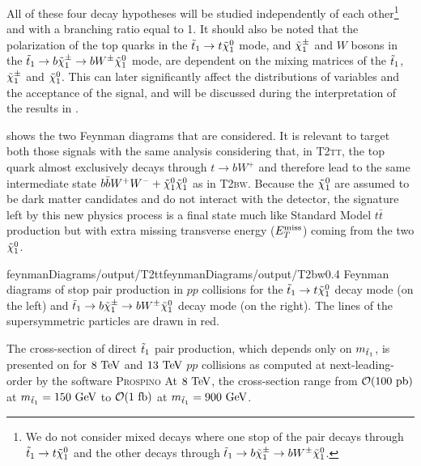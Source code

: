         All of these four decay hypotheses will be studied independently
        of each other\footnote{We do not consider mixed decays where one stop of the pair
        decays through $\tilde{t}_1 \rightarrow t \tilde{\chi}_1^0$ and the other decays through
        $\tilde{t}_1 \rightarrow b \tilde{\chi}_1^\pm \rightarrow b W^{\pm} \tilde{\chi}_1^0$.} and with a
        branching ratio equal to 1. It should also be noted that the polarization of the
        top quarks in the $\tilde{t}_1 \rightarrow t \tilde{\chi}_1^0$ mode, and $\tilde{\chi}_1^\pm$ and
        $W$ bosons in the $\tilde{t}_1 \rightarrow b \tilde{\chi}_1^\pm \rightarrow b W^{\pm}
        \tilde{\chi}_1^0$ mode, are dependent on the mixing matrices of the $\tilde{t}_1$, $\tilde{\chi}_1^\pm$
        and $\tilde{\chi}_1^0$. This can later significantly affect the distributions of
        variables and the acceptance of the signal, and will be discussed during the
        interpretation of the results in .

         shows the two Feynman diagrams that are
        considered. It is relevant to target both those signals with the same analysis
        considering that, in \textsc{T2tt}, the top quark almost exclusively decays
        through $t \rightarrow b W^+$ and therefore lead to the same intermediate state
        $b \bar{b} W^+ W^- + \tilde{\chi}_1^0 \tilde{\chi}_1^0$ as in \textsc{T2bw}. Because the
        $\tilde{\chi}_1^0$ are assumed to be dark matter candidates and do not interact with
        the detector, the signature left by this new physics process is a final state much
        like Standard Model $t\bar{t}$ production but with extra missing transverse energy
        ($E_T^\text{miss}$) coming from the two $\tilde{\chi}_1^0$.

                         {feynmanDiagrams/output/T2tt}{feynmanDiagrams/output/T2bw}{0.4}
                         {Feynman diagrams of stop pair production in $pp$ collisions for the
                         $\tilde{t}_1 \rightarrow t \tilde{\chi}_1^0$ decay mode (on the left) and
                         $\tilde{t}_1 \rightarrow b \tilde{\chi}_1^\pm \rightarrow b W^{\pm} \tilde{\chi}_1^0$ decay mode
                         (on the right). The lines of the supersymmetric particles are drawn in red.}

        The cross-section of direct $\tilde{t}_1$ pair production, which depends only on $m_{\tilde{t}_1}$, is presented
        on  for $8~\text{TeV}$ and $13~\text{TeV}$ $pp$ collisions as computed at next-leading-order
        by the software \textsc{Prospino} \cite{Prospino} At $8~\text{TeV}$, the cross-section range from $\mathcal{O}(100~\text{pb})$
        at $m_{\tilde{t}_1} = 150~\text{GeV}$ to $\mathcal{O}(1~\text{fb})$ at $m_{\tilde{t}_1} = 900 ~\text{GeV}$.

